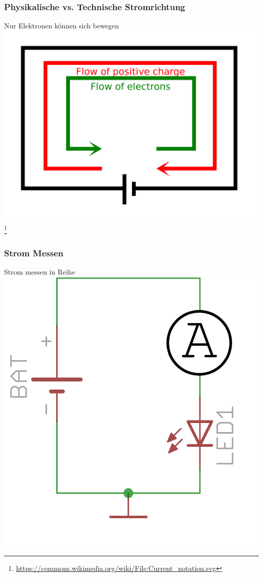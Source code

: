 \begin{frame}
    \frametitle{Physikalische vs. Technische Stromrichtung}
	\begin{center}
		Nur Elektronen können sich bewegen
	    \includegraphics[width=.8\textwidth]{e02/Current_notation.png}\\
	    \footnote{\tiny \url{https://commons.wikimedia.org/wiki/File:Current_notation.svg}}
	 \end{center}
\end{frame}

\begin{frame}
    \frametitle{Strom Messen}
    \begin{center}
    	Strom messen in Reihe
        \includegraphics[width=.8\textwidth]{e02/reiheAmpare.png}
	\end{center}
\end{frame}

